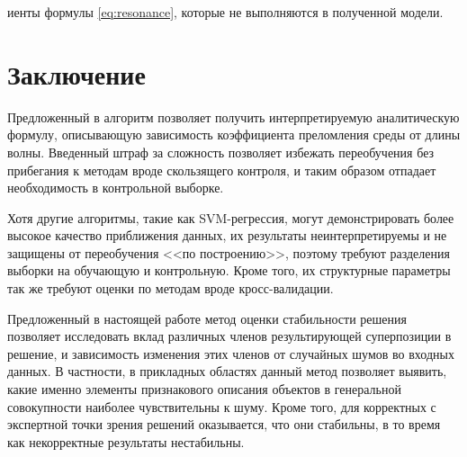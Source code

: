 \documentclass[12pt,a4paper]{article}
\theoremstyle{definition}
\begin{document}
иенты формулы \eqref{eq:resonance},
которые не выполняются в полученной модели.

\FloatBarrier

\section{Заключение}

Предложенный в \cite{Rudoy13} алгоритм позволяет получить интерпретируемую аналитическую
формулу, описывающую зависимость коэффициента преломления среды от длины волны.
Введенный штраф за сложность позволяет избежать переобучения без прибегания к методам
вроде скользящего контроля, и таким образом отпадает необходимость в контрольной выборке.

Хотя другие алгоритмы, такие как SVM-регрессия, могут демонстрировать более высокое
качество приближения данных, их результаты неинтерпретируемы и не защищены от переобучения
<<по построению>>, поэтому требуют разделения выборки на обучающую и контрольную. Кроме
того, их структурные параметры так же требуют оценки по методам вроде кросс-валидации.

Предложенный в настоящей работе метод оценки стабильности решения позволяет исследовать вклад различных
членов результирующей суперпозиции в решение, и зависимость изменения этих членов от
случайных шумов во входных данных. В частности, в прикладных областях данный метод позволяет
выявить, какие именно элементы признакового описания объектов в генеральной совокупности
наиболее чувствительны к шуму. Кроме того, для корректных с экспертной точки зрения
решений оказывается, что они стабильны, в то время как некорректные результаты нестабильны.

\FloatBarrier


%
%

\end{document}
